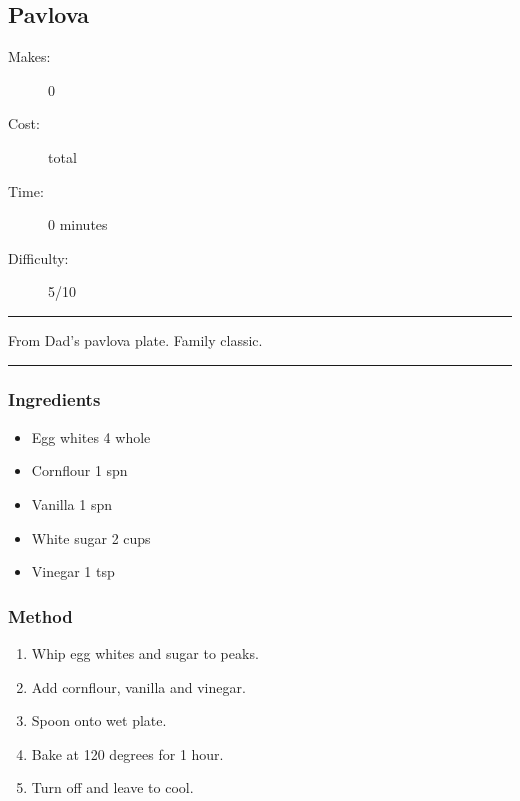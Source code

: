 \documentclass[]{article}
\begin{document}
\subsection*{\center\huge Pavlova}
\begin{description}
\item[Makes:] 0 
\item[Cost:]  total
\item[Time:] 0 minutes
\item[Difficulty:] 5/10
\end{description}
\vspace{0.2cm}\hrule\vspace{0.5cm}
\begin{adjustwidth}{0.5 cm}{0.5 cm}

From Dad's pavlova plate. Family classic. \hfill\color{accent}{\Large\faVimeoSquare\hspace{0.1cm}\faGlide\hspace{0.1cm}\faHeart\hspace{0.1cm}}\color{black}

\end{adjustwidth}
\vspace{0.5cm}\hrule
\subsubsection*{\Large Ingredients}
\begin{multicols}{2}
\begin{itemize}
 \item Egg whites \hfill 4 whole
 \item Cornflour \hfill 1 spn
 \item Vanilla \hfill 1 spn
 \item White sugar \hfill 2 cups
 \item Vinegar \hfill 1 tsp
\end{itemize}
\end{multicols}
\subsubsection*{\Large Method}
\begin{enumerate}[font=\huge\color{accent}]
	\item Whip egg whites and sugar to peaks.
	\item Add cornflour, vanilla and vinegar.
	\item Spoon onto wet plate.
	\item Bake at 120 degrees for 1 hour.
	\item Turn off and leave to cool.
\end{enumerate}
\newpage
{}\label{rec:Vanilla Butter Cake}
\end{document}
